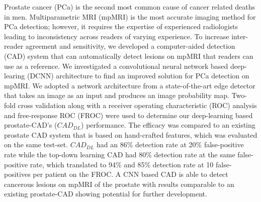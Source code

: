 Prostate cancer (PCa) is the second most common cause of cancer related deaths in men. Multiparametric MRI (mpMRI) is the most accurate imaging method for PCa detection; however, it requires the expertise of experienced radiologists leading to inconsistency across readers of varying experience. To increase inter-reader agreement and sensitivity, we developed a computer-aided detection (CAD) system that can automatically detect lesions on mpMRI that readers can use as a reference. We investigated a convolutional neural network based deep-learing (DCNN) architecture to find an improved solution for PCa detection on mpMRI. We adopted a network architecture from a state-of-the-art edge detector that takes an image as an input and produces an image probability map. Two-fold cross validation along with a receiver operating characteristic (ROC) analysis and free-response ROC (FROC) were used to determine our deep-learning based prostate-CAD's ($CAD_{DL}$) performance. The efficacy was compared to an existing prostate CAD system that is based on hand-crafted features, which was evaluated on the same test-set. $CAD_{DL}$ had an 86\% detection rate at 20\% false-positive rate while the top-down learning CAD had 80\% detection rate at the same false-positive rate, which translated to 94\% and 85\% detection rate at 10 false-positives per patient on the FROC. A CNN based CAD is able to detect cancerous lesions on mpMRI of the prostate with results comparable to an existing prostate-CAD showing potential for further development.
